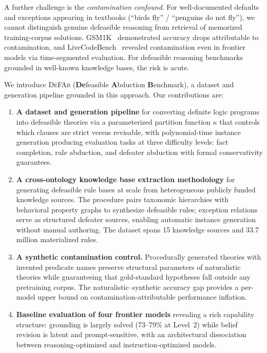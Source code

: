 \documentclass{article}
\theoremstyle{definition}
\newcommand{\partfunc}{\kappa}
\begin{document}
A further challenge is the \textit{contamination confound}. For well-documented defaults and exceptions appearing in textbooks (``birds fly'' / ``penguins do not fly''), we cannot distinguish genuine defeasible reasoning from retrieval of memorized training-corpus solutions. GSM1K~\cite{zhang2024gsm1k} demonstrated accuracy drops attributable to contamination, and LiveCodeBench~\cite{jain2025livecodebench} revealed contamination even in frontier models via time-segmented evaluation. For defeasible reasoning benchmarks grounded in well-known knowledge bases, the risk is acute.

We introduce \textsc{DeFAb} (\textbf{De}feasible \textbf{A}bduction \textbf{B}enchmark), a dataset and generation pipeline grounded in this approach. Our contributions are:

\begin{enumerate}[label=(\arabic*),nosep]
    \item \textbf{A dataset and generation pipeline} for converting definite logic programs into defeasible theories via a parameterized partition function $\partfunc$ that controls which clauses are strict versus revisable, with polynomial-time instance generation producing evaluation tasks at three difficulty levels: fact completion, rule abduction, and defeater abduction with formal conservativity guarantees.

    \item \textbf{A cross-ontology knowledge base extraction methodology} for generating defeasible rule bases at scale from heterogeneous publicly funded knowledge sources. The procedure pairs taxonomic hierarchies with behavioral property graphs to synthesize defeasible rules; exception relations serve as structured defeater sources, enabling automatic instance generation without manual authoring. The dataset spans 15 knowledge sources and 33.7 million materialized rules.

    \item \textbf{A synthetic contamination control.} Procedurally generated theories with invented predicate names preserve structural parameters of naturalistic theories while guaranteeing that gold-standard hypotheses fall outside any pretraining corpus. The naturalistic--synthetic accuracy gap provides a per-model upper bound on contamination-attributable performance inflation.

    \item \textbf{Baseline evaluation of four frontier models} revealing a rich capability structure: grounding is largely solved (73--79\% at Level~2) while belief revision is latent and prompt-sensitive, with an architectural dissociation between reasoning-optimized and instruction-optimized models.


\end{enumerate}
\end{document}
